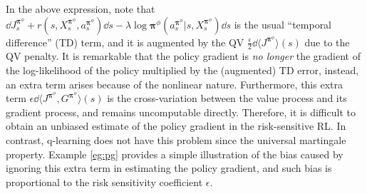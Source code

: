 In the above expression, note that $\dd J^{\bm\pi^{\phi}}_s + r(s,X_s^{\bm\pi^{\phi}},a_s^{\bm\pi^{\phi}})\dd s -\lambda\log \bm\pi^{\phi}(a_s^{\bm\pi^{\phi}}|s,X_s^{\bm\pi^{\phi}})\dd s$ is the usual ``temporal difference'' (TD) term, and it is augmented by the QV $\frac{\epsilon}{2}\dd \langle J^{\bm\pi^{\phi}} \rangle(s)$ due to the QV penalty. It is remarkable that the policy gradient is \textit{no longer} the gradient of the log-likelihood of the policy multiplied by the (augmented) TD error, instead, an extra term arises because of the nonlinear nature. Furthermore, this extra term $\epsilon \dd \langle J^{\bm\pi^{\phi}}, G^{\bm\pi^{\phi}} \rangle(s)$ is the cross-variation between the value process and its gradient process, and remains uncomputable directly. Therefore, it is difficult to obtain an unbiased estimate of the policy gradient in the risk-sensitive RL. In contrast, q-learning does not have this problem since the universal martingale property. Example \ref{eg:pg} provides a simple illustration of the bias caused by ignoring this extra term in estimating the policy gradient, and such bias is proportional to the risk sensitivity coefficient $\epsilon$. 

